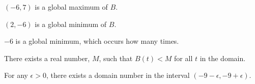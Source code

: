 \documentclass{ximera}
\begin{document}
\begin{exercise}
\begin{question} 


$(-6, 7)$ is a global maximum of $B$. \\


\begin{multipleChoice}
\end{multipleChoice}




$(2, -6)$ is a global minimum of $B$. \\


\begin{multipleChoice}
\end{multipleChoice}

\end{question}






\begin{question} 



$-6$ is a global minimum, which occurs how many times.


\begin{multipleChoice}
\end{multipleChoice}


\end{question}





\begin{question} 

There exists a real number, $M$, such that $B(t) < M$ for all $t$ in the domain.
\begin{multipleChoice}
\end{multipleChoice}

\end{question}







\begin{question} 

For any $\epsilon > 0$, there exists a domain number in the interval $(-9-\epsilon, -9+\epsilon)$.
\begin{multipleChoice}
\end{multipleChoice}



\end{question}
\end{exercise}
\end{document}
